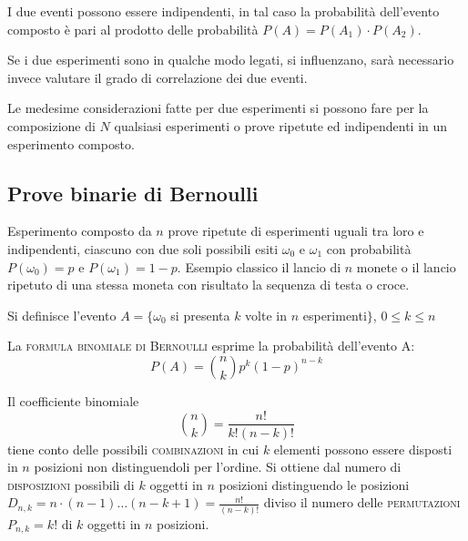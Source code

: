 I due eventi possono essere indipendenti, in tal caso la probabilità dell'evento composto è pari al prodotto delle probabilità $P(A)=P(A_1)\cdot P(A_2)$.

Se i due esperimenti sono in qualche modo legati, si influenzano, sarà necessario invece valutare il grado di correlazione dei due eventi.

Le medesime considerazioni fatte per due esperimenti si possono fare per la composizione di $N$ qualsiasi esperimenti o prove ripetute ed indipendenti in un esperimento composto.

\subsection{Prove binarie di Bernoulli}
Esperimento composto da $n$ prove ripetute di esperimenti uguali tra loro e indipendenti, ciascuno con due soli possibili esiti $\omega_0$ e $\omega_1$ con probabilità $P(\omega_0)=p$ e $P(\omega_1)=1-p$.
Esempio classico il lancio di $n$ monete o il lancio ripetuto di una stessa moneta con risultato la sequenza di testa o croce.

Si definisce l'evento $A=\lbrace\omega_0$ si presenta $k$ volte in $n$ esperimenti$\rbrace$, $0\leq k\leq n$

La \textsc{formula binomiale di Bernoulli} esprime la probabilità dell'evento A:
\begin{equation}
P(A)=\binom{n}{k} p^k (1-p)^{n-k}
\end{equation}

Il coefficiente binomiale 
\begin{equation}\binom{n}{k}=\frac{n!}{k!(n-k)!}\end{equation}
tiene conto delle possibili \textsc{combinazioni} in cui $k$ elementi possono essere disposti in $n$ posizioni non distinguendoli per l'ordine. Si ottiene dal numero di \textsc{disposizioni} possibili di $k$ oggetti in $n$ posizioni distinguendo le posizioni $D_{n,k}=n\cdot(n-1)\dots(n-k+1)=\frac{n!}{(n-k)!}$ diviso il numero delle \textsc{permutazioni} $P_{n,k}=k!$ di $k$ oggetti in $n$ posizioni.

